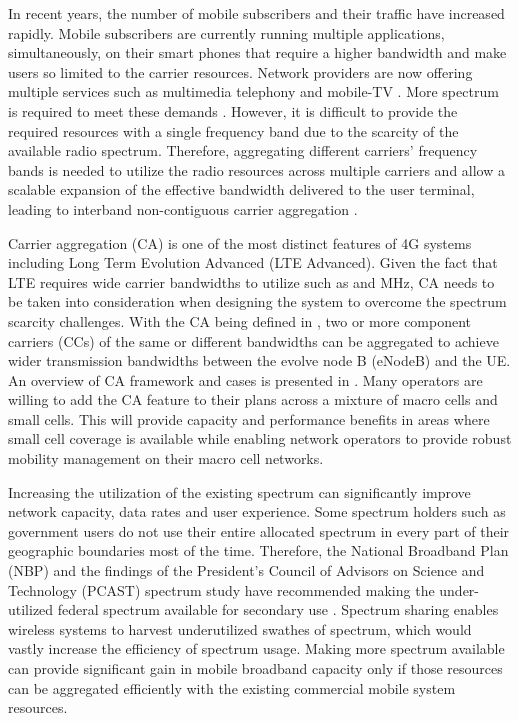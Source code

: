 \documentclass[journal]{IEEEtran} 		\usepackage{amsmath,amssymb}
\begin{document}
In recent years, the number of mobile subscribers and their traffic have increased rapidly. Mobile subscribers are currently running multiple applications, simultaneously, on their smart phones that require a higher bandwidth and make users so limited to the carrier resources. Network providers are now offering multiple services such as multimedia telephony and mobile-TV \cite{QoS_3GPP}. More spectrum is required to meet these demands \cite{Carrier_Agg_1}. However, it is difficult to provide the required resources with a single frequency band due to the scarcity of the available radio spectrum. Therefore, aggregating different carriers' frequency bands is needed to utilize the radio resources across multiple carriers and allow a scalable expansion of the effective bandwidth delivered to the user terminal, leading to interband non-contiguous carrier aggregation \cite{Carrier_Agg_2}.

Carrier aggregation (CA) is one of the most distinct features of 4G systems including Long Term Evolution Advanced (LTE Advanced). Given the fact that LTE requires wide carrier bandwidths to utilize such as  and  MHz, CA needs to be taken into consideration when designing the system to overcome the spectrum scarcity challenges. With the CA being defined in \cite{work-item}, two or more component carriers (CCs) of the same or different bandwidths can be aggregated to achieve wider transmission bandwidths between the evolve node B (eNodeB) and the UE. An overview of CA framework and cases is presented in \cite{CA-framework}. Many operators are willing to add the CA feature to their plans across a mixture of macro cells and small cells. This will provide capacity and performance benefits in areas where small cell coverage is available while enabling network operators to provide robust mobility management on their macro cell networks.

Increasing the utilization of the existing spectrum can significantly improve network capacity, data rates and user experience. Some spectrum holders such as government users do not use their entire allocated spectrum in every part of their geographic boundaries most of the time. Therefore, the National Broadband Plan (NBP) and the findings of the President's Council of Advisors on Science and Technology (PCAST) spectrum study have recommended making the under-utilized federal spectrum available for secondary use \cite{PCAST}. Spectrum sharing enables wireless systems to harvest underutilized swathes of spectrum, which would vastly increase the efficiency of spectrum usage. Making more spectrum available can provide significant gain in mobile broadband capacity only if those resources can be aggregated efficiently with the existing commercial mobile system resources.
\end{document}
